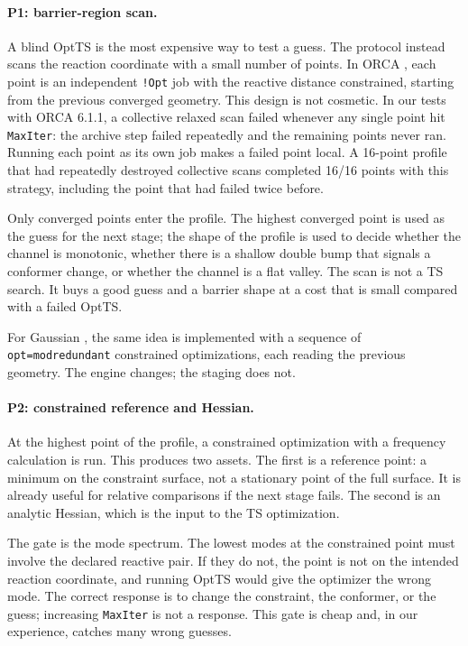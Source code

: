 \documentclass[11pt,a4paper]{article}
\begin{document}
\paragraph{P1: barrier-region scan.}
A blind OptTS is the most expensive way to test a guess. The protocol instead scans the reaction coordinate with a small number of points. In ORCA \citep{Neese2012ORCA,Neese2025ORCA6}, each point is an independent \texttt{!Opt} job with the reactive distance constrained, starting from the previous converged geometry. This design is not cosmetic. In our tests with ORCA 6.1.1, a collective relaxed scan failed whenever any single point hit \texttt{MaxIter}: the archive step failed repeatedly and the remaining points never ran. Running each point as its own job makes a failed point local. A 16-point profile that had repeatedly destroyed collective scans completed 16/16 points with this strategy, including the point that had failed twice before.

Only converged points enter the profile. The highest converged point is used as the guess for the next stage; the shape of the profile is used to decide whether the channel is monotonic, whether there is a shallow double bump that signals a conformer change, or whether the channel is a flat valley. The scan is not a TS search. It buys a good guess and a barrier shape at a cost that is small compared with a failed OptTS.

For Gaussian \citep{Gaussian16}, the same idea is implemented with a sequence of \texttt{opt=modredundant} constrained optimizations, each reading the previous geometry. The engine changes; the staging does not.

\paragraph{P2: constrained reference and Hessian.}
At the highest point of the profile, a constrained optimization with a frequency calculation is run. This produces two assets. The first is a reference point: a minimum on the constraint surface, not a stationary point of the full surface. It is already useful for relative comparisons if the next stage fails. The second is an analytic Hessian, which is the input to the TS optimization.

The gate is the mode spectrum. The lowest modes at the constrained point must involve the declared reactive pair. If they do not, the point is not on the intended reaction coordinate, and running OptTS would give the optimizer the wrong mode. The correct response is to change the constraint, the conformer, or the guess; increasing \texttt{MaxIter} is not a response. This gate is cheap and, in our experience, catches many wrong guesses.
\end{document}
